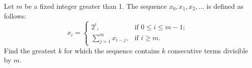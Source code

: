 Let $m$ be a fixed integer greater than 1. The sequence $x_0, x_1, x_2, \ldots$ is defined as follows:
\[
x_i = \begin{cases} 2^i, & \text{if } 0 \leq i \leq m-1; \\ \sum_{j=1}^{m} x_{i-j}, & \text{if } i \geq m. \end{cases}
\]
Find the greatest $k$ for which the sequence contains $k$ consecutive terms divisible by $m$.
